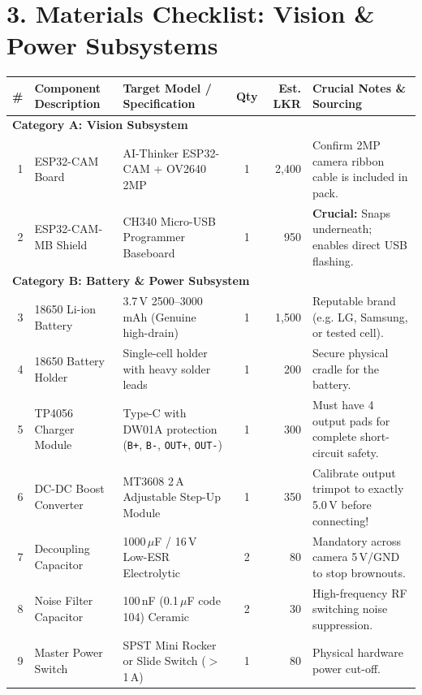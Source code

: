 \documentclass[10pt,a4paper]{article}
\begin{document}
\section{3. Materials Checklist: Vision \& Power Subsystems}
\small
\begin{tabularx}{\textwidth}{rXlcrX}
\toprule
\textbf{\#} & \textbf{Component Description} & \textbf{Target Model / Specification} & \textbf{Qty} & \textbf{Est. LKR} & \textbf{Crucial Notes \& Sourcing} \\
\midrule
\multicolumn{6}{l}{\textbf{\color{primary}Category A: Vision Subsystem}} \\
1 & ESP32-CAM Board & AI-Thinker ESP32-CAM + OV2640 2MP & 1 & 2,400 & Confirm 2MP camera ribbon cable is included in pack. \\
2 & ESP32-CAM-MB Shield & CH340 Micro-USB Programmer Baseboard & 1 & 950 & \textbf{Crucial:} Snaps underneath; enables direct USB flashing. \\
\midrule
\multicolumn{6}{l}{\textbf{\color{primary}Category B: Battery \& Power Subsystem}} \\
3 & 18650 Li-ion Battery & 3.7\,V 2500--3000\,mAh (Genuine high-drain) & 1 & 1,500 & Reputable brand (e.g. LG, Samsung, or tested cell). \\
4 & 18650 Battery Holder & Single-cell holder with heavy solder leads & 1 & 200 & Secure physical cradle for the battery. \\
5 & TP4056 Charger Module & Type-C with DW01A protection (\texttt{B+}, \texttt{B-}, \texttt{OUT+}, \texttt{OUT-}) & 1 & 300 & Must have 4 output pads for complete short-circuit safety. \\
6 & DC-DC Boost Converter & MT3608 2\,A Adjustable Step-Up Module & 1 & 350 & Calibrate output trimpot to exactly 5.0\,V before connecting! \\
7 & Decoupling Capacitor & 1000\,$\mu$F / 16\,V Low-ESR Electrolytic & 2 & 80 & Mandatory across camera 5\,V/GND to stop brownouts. \\
8 & Noise Filter Capacitor & 100\,nF (0.1\,$\mu$F code 104) Ceramic & 2 & 30 & High-frequency RF switching noise suppression. \\
9 & Master Power Switch & SPST Mini Rocker or Slide Switch ($>$1\,A) & 1 & 80 & Physical hardware power cut-off. \\
\bottomrule
\end{tabularx}

\newpage
\end{document}
